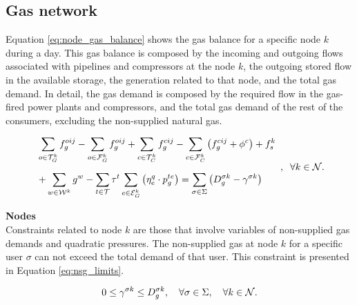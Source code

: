 
\subsection{Gas network}

Equation \ref{eq:node_gas_balance} shows the gas balance for a specific node $k$ during a day. This gas balance is composed by the incoming and outgoing flows associated with pipelines and compressors at the node $k$, the outgoing stored flow in the available storage, the generation related to that node, and the total gas demand. In detail, the gas demand is composed by the required flow in the gas-fired power plants and compressors, and the total gas demand of the rest of the consumers, excluding the non-supplied natural gas. 

\begin{equation}
\begin{array}{l}\displaystyle
\sum_{o \in {\cal{T}}^{k}_{G}}{{f}_{g}^{oij}} - \sum_{o \in {\cal{F}}^{k}_{G}}{{f}_{g}^{oij}} + \sum_{c \in {\cal{T}}^{k}_{C}}{{f}_{g}^{cij}} - \sum_{c \in {\cal{F}}^{k}_{C}}{ \left({f}_{g}^{cij} + \phi^{c}\right)} + {f}^{k}_{s}\\ [0.8cm] \displaystyle
+ \sum_{w \in {\cal{W}}^{k}}{g^{w}}  - \sum_{t \in \cal{T}} {\tau}^{t} \sum_{e \in {\cal{E}}^{k}_{G}}\left({\eta^{q}_{e}}\cdot {p_{g}^{te}}\right) = {\sum_{\sigma \in \Sigma}\left( D^{\sigma k}_{g} - \gamma^{\sigma k}\right)} \\
\end{array}
,\;\; \forall k \in \cal{N}.
\label{eq:node_gas_balance}
\end{equation}

\newpage
\noindent \textbf{Nodes}\\

Constraints related to node $k$ are those that involve variables of non-supplied gas demands and quadratic pressures. The non-supplied gas at node $k$ for a specific user $\sigma$ can not exceed the total demand of that user. This constraint is presented in Equation \ref{eq:nsg_limits}.

\begin{equation}
{0 \le \gamma^{\sigma k} \le D^{\sigma k}_{g}, \quad \forall \sigma \in \Sigma, \quad \forall k \in \cal{N}}.
\label{eq:nsg_limits}
\vspace{0.3cm}
\end{equation}

